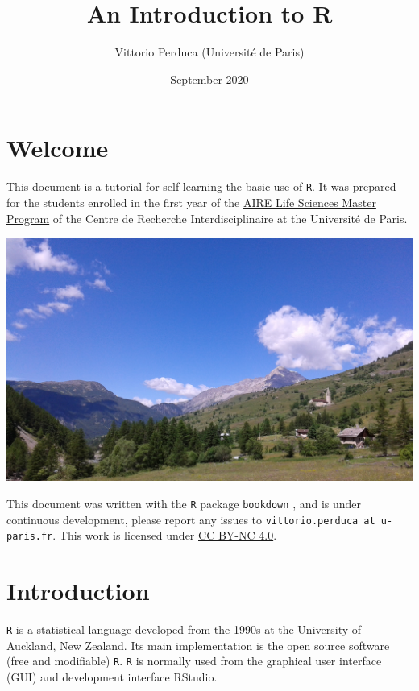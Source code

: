 \documentclass[]{book}
\title{An Introduction to R}
\author{Vittorio Perduca (Université de Paris)}
\date{September 2020}
\begin{document}
\maketitle

{
\setcounter{tocdepth}{1}
\tableofcontents
}
\hypertarget{welcome}{%
\chapter{Welcome}\label{welcome}}

This document is a tutorial for self-learning the basic use of \texttt{R}. It was prepared for the students enrolled in the first year of the \href{https://www.cri-paris.org/en/education\#04._aire-master}{AIRE Life Sciences Master Program} of the Centre de Recherche Interdisciplinaire at the Université de Paris.

\begin{center}\includegraphics[width=0.9\linewidth]{images/san-restituto} \end{center}

This document was written with the \texttt{R} package \texttt{bookdown} \citep{R-bookdown}, \citep{bookdown2016} and is under continuous development, please report any issues to \texttt{vittorio.perduca\ at\ u-paris.fr}. This work is licensed under \href{https://creativecommons.org/licenses/by-nc/4.0/}{CC BY-NC 4.0}.

\hypertarget{introduction}{%
\chapter{Introduction}\label{introduction}}

\texttt{R} is a statistical language developed from the 1990s at the University of Auckland, New Zealand. Its main implementation is the open source software (free and modifiable) \texttt{R}. \texttt{R} is normally used from the graphical user interface (GUI) and development interface RStudio.
\end{document}
